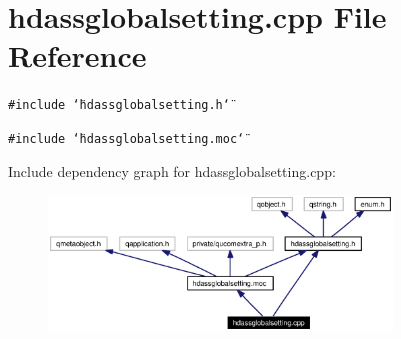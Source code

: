 \section{hdassglobalsetting.cpp File Reference}
\label{hdassglobalsetting_8cpp}


{\tt \#include \char`\"{}hdassglobalsetting.h\char`\"{}}\par
{\tt \#include \char`\"{}hdassglobalsetting.moc\char`\"{}}\par


Include dependency graph for hdassglobalsetting.cpp:\begin{figure}[H]
\begin{center}
\leavevmode
\includegraphics[width=259pt]{hdassglobalsetting_8cpp__incl}
\end{center}
\end{figure}

